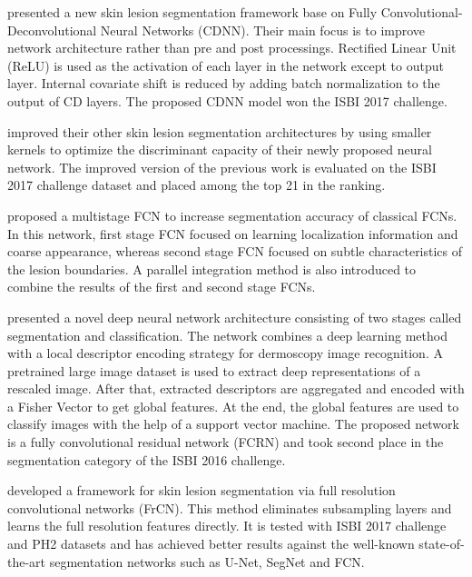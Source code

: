     \citet{yuan2017automatic2} presented a new skin lesion segmentation framework base on Fully Convolutional-Deconvolutional Neural Networks (CDNN).
    Their main focus is to improve network architecture rather than pre and post processings.
    Rectified Linear Unit (ReLU) is used as the activation of each layer in the network except to output layer.
    Internal covariate shift is reduced by adding batch normalization to the output of CD layers.
    The proposed CDNN model won the ISBI 2017 challenge.

    \citet{yuan2017improving} improved their other skin lesion segmentation architectures by using smaller kernels to optimize the discriminant capacity of their newly proposed neural network.
    The improved version of the previous work is evaluated on the ISBI 2017 challenge dataset and placed among the top 21 in the ranking.

    \citet{bi2017dermoscopic} proposed a multistage FCN to increase segmentation accuracy of classical FCNs.
    In this network, first stage FCN focused on learning localization information and coarse appearance,
    whereas second stage FCN focused on subtle characteristics of the lesion boundaries.
    A parallel integration method is also introduced to combine the results of the first and second stage FCNs.

    \citet{yu2018melanoma} presented a novel deep neural network architecture  consisting of two stages called segmentation and classification.
    The network combines a deep learning method with a local descriptor encoding strategy for dermoscopy image recognition.
    A pretrained large image dataset is used to extract deep representations of a rescaled image.
    After that, extracted descriptors are aggregated and encoded with a Fisher Vector to get global features.
    At the end, the global features are used to classify images with the help of a support vector machine.
    The proposed network is a fully convolutional residual network (FCRN) and took second place in the segmentation category of the ISBI 2016 challenge.

    \citet{al2018skin} developed a framework for skin lesion segmentation via full resolution convolutional networks (FrCN).
    This method eliminates subsampling layers and learns the full resolution features directly.
    It is tested with ISBI 2017 challenge and PH2 datasets and has achieved better results against the well-known state-of-the-art segmentation networks such as U-Net, SegNet and FCN.

